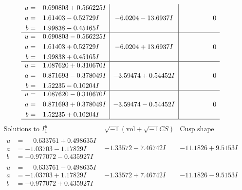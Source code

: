 \documentclass[1p]{elsarticle_modified}
\theoremstyle{definition}
\newcommand{\I}{\sqrt{-1}}
\begin{document}
$$\begin{array}{c|c|c}
\begin{aligned}
u &= \phantom{-}0.690803 + 0.566225 I \\
a &= \phantom{-}1.61403 - 0.52729 I \\
b &= \phantom{-}1.99838 - 0.45165 I\end{aligned}
 & -6.0204 - 13.6937 I & \phantom{-0.000000 } 0 \\ \hline\begin{aligned}
u &= \phantom{-}0.690803 - 0.566225 I \\
a &= \phantom{-}1.61403 + 0.52729 I \\
b &= \phantom{-}1.99838 + 0.45165 I\end{aligned}
 & -6.0204 + 13.6937 I & \phantom{-0.000000 } 0 \\ \hline\begin{aligned}
u &= \phantom{-}1.087620 + 0.310670 I \\
a &= \phantom{-}0.871693 - 0.378049 I \\
b &= \phantom{-}1.52235 - 0.10204 I\end{aligned}
 & -3.59474 + 0.54452 I & \phantom{-0.000000 } 0 \\ \hline\begin{aligned}
u &= \phantom{-}1.087620 - 0.310670 I \\
a &= \phantom{-}0.871693 + 0.378049 I \\
b &= \phantom{-}1.52235 + 0.10204 I\end{aligned}
 & -3.59474 - 0.54452 I & \phantom{-0.000000 } 0\\
 \hline 
 \end{array}$$\newpage$$\begin{array}{c|c|c}  
\text{Solutions to }I^u_{1}& \I (\text{vol} + \sqrt{-1}CS) & \text{Cusp shape}\\
 \hline 
\begin{aligned}
u &= \phantom{-}0.633761 + 0.498635 I \\
a &= -1.03703 - 1.17829 I \\
b &= -0.977072 - 0.435927 I\end{aligned}
 & -1.33572 - 7.46742 I & -11.1826 + 9.5153 I \\ \hline\begin{aligned}
u &= \phantom{-}0.633761 - 0.498635 I \\
a &= -1.03703 + 1.17829 I \\
b &= -0.977072 + 0.435927 I\end{aligned}
 & -1.33572 + 7.46742 I & -11.1826 - 9.5153 I \\ \hline\begin{aligned}

\end{aligned}
\end{array}$$
\end{document}
